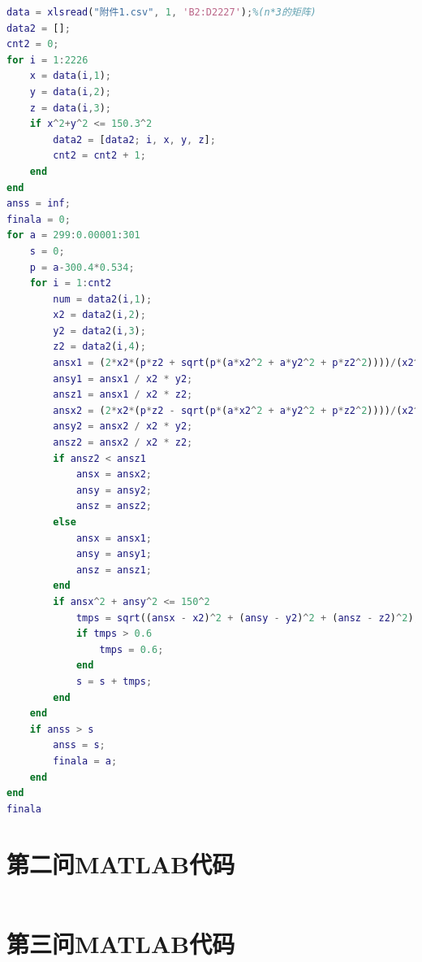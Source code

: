 \documentclass[withoutpreface,bwprint]{cumcmthesis} %
\begin{document}
\begin{appendices}
\begin{lstlisting}[language=matlab]
%读入数据
data = xlsread("附件1.csv", 1, 'B2:D2227');%(n*3的矩阵)
data2 = [];
cnt2 = 0;
for i = 1:2226
    x = data(i,1);
    y = data(i,2);
    z = data(i,3);
    if x^2+y^2 <= 150.3^2
        data2 = [data2; i, x, y, z];
        cnt2 = cnt2 + 1;
    end
end
anss = inf;
finala = 0;
for a = 299:0.00001:301
    s = 0;
    p = a-300.4*0.534;
    for i = 1:cnt2
        num = data2(i,1);
        x2 = data2(i,2);
        y2 = data2(i,3);
        z2 = data2(i,4);
        ansx1 = (2*x2*(p*z2 + sqrt(p*(a*x2^2 + a*y2^2 + p*z2^2))))/(x2^2 + y2^2); 
        ansy1 = ansx1 / x2 * y2;
        ansz1 = ansx1 / x2 * z2;
        ansx2 = (2*x2*(p*z2 - sqrt(p*(a*x2^2 + a*y2^2 + p*z2^2))))/(x2^2 + y2^2);
        ansy2 = ansx2 / x2 * y2;
        ansz2 = ansx2 / x2 * z2;
        if ansz2 < ansz1
            ansx = ansx2;
            ansy = ansy2;
            ansz = ansz2;
        else
            ansx = ansx1;
            ansy = ansy1;
            ansz = ansz1;
        end
        if ansx^2 + ansy^2 <= 150^2
            tmps = sqrt((ansx - x2)^2 + (ansy - y2)^2 + (ansz - z2)^2);
            if tmps > 0.6
                tmps = 0.6;
            end
            s = s + tmps;
        end
    end
    if anss > s
        anss = s;
        finala = a;
    end
end
finala
\end{lstlisting}
\section{第二问MATLAB代码}
\begin{lstlisting}[language=matlab]
\end{lstlisting}
\section{第三问MATLAB代码}
\begin{lstlisting}[language=matlab]
\end{lstlisting}
\end{appendices}
\end{document}
